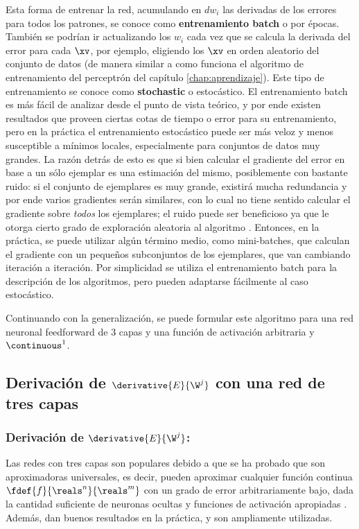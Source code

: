 Esta forma de entrenar la red, acumulando en $dw_i$ las derivadas de los errores para todos los patrones, se conoce como \textbf{entrenamiento batch} o por épocas. También se podrían ir actualizando los $w_i$ cada vez que se calcula la derivada del error para cada $\xv$, por ejemplo, eligiendo los $\xv$ en orden aleatorio del conjunto de datos (de manera similar a como funciona el algoritmo de entrenamiento del perceptrón del capítulo \ref{chap:aprendizaje}). Este tipo de entrenamiento se conoce como \textbf{stochastic} o estocástico. El entrenamiento batch es más fácil de analizar desde el punto de vista teórico, y por ende existen resultados que proveen ciertas cotas de tiempo o error para su entrenamiento, pero en la práctica el entrenamiento estocástico puede ser más veloz y menos susceptible a mínimos locales, especialmente para conjuntos de datos muy grandes. La razón detrás de esto es que si bien calcular el gradiente del error en base a un sólo ejemplar es una estimación del mismo, posiblemente con bastante ruido: si el conjunto de ejemplares es muy grande, existirá mucha redundancia y por ende varios gradientes serán similares, con lo cual no tiene sentido calcular el gradiente sobre \textit{todos} los ejemplares; el ruido puede ser beneficioso ya que le otorga cierto grado de exploración aleatoria al algoritmo \cite{lecun1998}. Entonces, en la práctica, se puede utilizar algún término medio, como mini-batches, que calculan el gradiente con un pequeños subconjuntos de los ejemplares, que van cambiando iteración a iteración. Por simplicidad se utiliza el entrenamiento batch para la descripción de los algoritmos, pero pueden adaptarse fácilmente al caso estocástico.

Continuando con la generalización, se puede formular este algoritmo para una red neuronal feedforward de $3$ capas y una función de activación arbitraria y $\continuous^1$.

\subsection{Derivación de $\derivative{E}{\W^j}$ con una red de tres capas} 

\subsubsection{Derivación de $\derivative{E}{\W^j}$:}

Las redes con tres capas son populares debido a que se ha probado que son aproximadoras universales, es decir, pueden aproximar cualquier función continua  $\fdef{f}{\reals^n}{\reals^m}$ con un grado de error arbitrariamente bajo, dada la cantidad suficiente de neuronas ocultas y funciones de activación apropiadas \cite{haykin1994}. Además, dan buenos resultados en la práctica, y son ampliamente utilizadas. 

